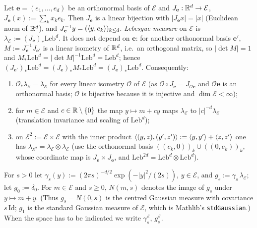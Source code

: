 Let $\mathbf e=(e_1,\dots,e_d)$ be an orthonormal basis of $\mathcal E$ and $J_{\mathbf e}:\mathbb{R}^d\to\mathcal E$, $J_{\mathbf e}(x):=\sum_kx_ke_k$. Then $J_{\mathbf e}$ is a linear bijection with $|J_{\mathbf e}x|=|x|$ (Euclidean norm of $\mathbb{R}^d$), and $J_{\mathbf e}^{-1}y=(\langle y,e_k\rangle)_{k\le d}$.
\emph{Lebesgue measure} on $\mathcal E$ is $\lambda_{\mathcal E}:=(J_{\mathbf e})_*\mathrm{Leb}^d$. It does not depend on $\mathbf e$: for another orthonormal basis $\mathbf e'$, $M:=J_{\mathbf e}^{-1}J_{\mathbf e'}$ is a linear isometry of $\mathbb{R}^d$, i.e.\ an orthogonal matrix, so $|\det M|=1$ and $M_*\mathrm{Leb}^d=|\det M|^{-1}\mathrm{Leb}^d=\mathrm{Leb}^d$; hence $(J_{\mathbf e'})_*\mathrm{Leb}^d=(J_{\mathbf e})_*M_*\mathrm{Leb}^d=(J_{\mathbf e})_*\mathrm{Leb}^d$. Consequently:
\begin{enumerate}[label=(L\arabic*),leftmargin=2.4em,itemsep=1pt]
\item\label{c3:L1} $\mathcal O_*\lambda_{\mathcal E}=\lambda_{\mathcal E}$ for every linear isometry $\mathcal O$ of $\mathcal E$ (as $\mathcal O\circ J_{\mathbf e}=J_{\mathcal O\mathbf e}$ and $\mathcal O\mathbf e$ is an orthonormal basis; $\mathcal O$ is bijective because it is injective and $\dim\mathcal E<\infty$);
\item\label{c3:L2} for $m\in\mathcal E$ and $c\in\mathbb{R}\setminus\{0\}$ the map $y\mapsto m+cy$ maps $\lambda_{\mathcal E}$ to $|c|^{-d}\lambda_{\mathcal E}$ (translation invariance and scaling of $\mathrm{Leb}^d$);
\item\label{c3:L3} on $\mathcal E^2:=\mathcal E\times\mathcal E$ with the inner product $\langle(y,z),(y',z')\rangle:=\langle y,y'\rangle+\langle z,z'\rangle$ one has $\lambda_{\mathcal E^2}=\lambda_{\mathcal E}\otimes\lambda_{\mathcal E}$ (use the orthonormal basis $((e_k,0))_k\cup((0,e_k))_k$, whose coordinate map is $J_{\mathbf e}\times J_{\mathbf e}$, and $\mathrm{Leb}^{2d}=\mathrm{Leb}^d\otimes\mathrm{Leb}^d$).
\end{enumerate}

\begin{auxdefinition}\label{c3:def:gauss}
For $s>0$ let $\gamma_s(y):=(2\pi s)^{-d/2}\exp(-|y|^2/(2s))$, $y\in\mathcal E$, and $g_s:=\gamma_s\,\lambda_{\mathcal E}$; let $g_0:=\delta_0$.
For $m\in\mathcal E$ and $s\ge0$, $N(m,s)$ denotes the image of $g_s$ under $y\mapsto m+y$. (Thus $g_s=N(0,s)$ is the centred Gaussian measure with covariance $s\,\mathrm{Id}$; $g_1$ is the standard Gaussian measure of $\mathcal E$, which is Mathlib's \texttt{stdGaussian}.)
When the space has to be indicated we write $\gamma^{\mathcal E}_s$, $g^{\mathcal E}_s$.
\end{auxdefinition}

